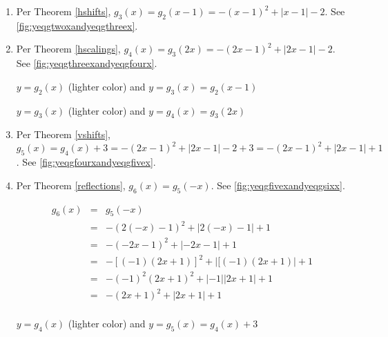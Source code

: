 \begin{ex}
\begin{enumerate}
\item  Per Theorem \ref{hshifts}, $g_{3}(x) = g_{2}(x-1) = -(x-1)^2+|x-1|-2$. See \autoref{fig:yeqgtwoxandyeqgthreex}.

\item  Per Theorem \ref{hscalings}, $g_{4}(x) = g_{3}(2x) = -(2x-1)^2+|2x-1| - 2$. See \autoref{fig:yeqgthreexandyeqgfourx}.

\begin{ifigure}


\caption{$y=g_{2}(x)$ (lighter color) and $y=g_{3}(x) = g_{2}(x-1)$}
\label{fig:yeqgtwoxandyeqgthreex}
\end{ifigure}

\begin{mfigure}


\caption{$y = g_{3}(x)$ (lighter color) and $y = g_{4}(x) = g_{3}(2x)$}
\label{fig:yeqgthreexandyeqgfourx}
\end{mfigure}

\item  Per Theorem \ref{vshifts}, $g_{5}(x) = g_{4}(x)+3 =  -(2x-1)^2+|2x-1| - 2 + 3 =  -(2x-1)^2+|2x-1| +1$. See \autoref{fig:yeqgfourxandyeqgfivex}.

\item  Per Theorem \ref{reflections}, $g_{6}(x) = g_{5}(-x)$. See \autoref{fig:yeqgfivexandyeqgsixx}.

\[ \begin{array}{rcl}

g_{6}(x) & = & g_{5}(-x) \\
 &  = &  -(2(-x)-1)^2+|2(-x)-1|+1 \\
  &  = & -(-2x-1)^2+|-2x-1|+1 \\
  &  = &  -[(-1)(2x+1)]^2+|[(-1)(2x+1)|+1 \\
  &  = &   -(-1)^2(2x+1)^2+|-1||2x+1| + 1 \\
  & =  & -(2x+1)^2+|2x+1|+1 \\
  
  \end{array} \]

\begin{mfigure}


\caption{$y=g_{4}(x)$ (lighter color) and $y=g_{5}(x) = g_{4}(x)+3$}
\label{fig:yeqgfourxandyeqgfivex}
\end{mfigure}


\end{enumerate}
\end{ex}
